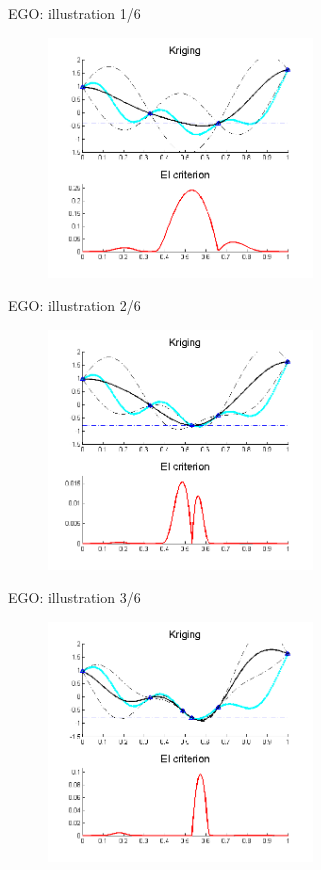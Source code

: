 \begin{frame}{EGO: illustration 1/6} \begin{figure}[h!] \centering	\includegraphics[width=7cm]{fig/ego1.png} \end{figure} \end{frame}
\begin{frame}[noframenumbering]{EGO: illustration  2/6}\begin{figure}[h!]  \centering	\includegraphics[width=7cm]{fig/ego2.png} \end{figure} \end{frame}
\begin{frame}[noframenumbering]{EGO: illustration  3/6}\begin{figure}[h!]  \centering	\includegraphics[width=7cm]{fig/ego3.png} \end{figure} \end{frame}
